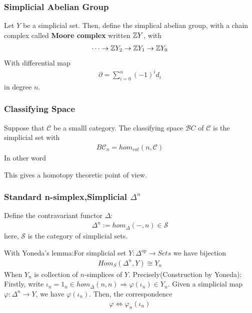 \documentclass[Total.tex]{subfiles}
\begin{document}
			\subsubsection{Simplicial Abelian Group}
				\begin{Def}
					Let $Y$ be a simplicial set. Then, define the simplical abelian group, with a chain complex called \textbf{Moore complex} written $\mathbb{Z} Y$, with
					\begin{gather*}
						\dots\rightarrow \mathbb{Z} Y_2\rightarrow \mathbb{Z} Y_1\rightarrow \mathbb{Z} Y_0
					\end{gather*}
					With differential map
					\begin{gather*}
						\partial=\sum_{i=0}^n (-1)^i d_i
					\end{gather*}
					in degree $n$. 
				\end{Def}
			\subsubsection{Classifying Space}
				\begin{Def}
					Suppose that $\mathcal{C}$ be a smalll category. The classifying space $\mathcal BC$ of $\mathcal{C}$ is the simplicial set with
					\begin{gather*}
						B\mathcal{C}_n=hom_{cat}(n,\mathcal{C})
					\end{gather*}
					In other word
					\begin{center}
					\end{center}
				\end{Def}
				This gives a homotopy theoretic point of view.
				\subsubsection{Standard n-simplex,Simplicial $\Delta^n$}
				\begin{Def}
					Define the contravariant functor $\Delta$:
					\begin{gather*}
						\Delta^n:=hom_\Delta(-,n)\in \mathcal{S}
					\end{gather*}
					here, $\mathcal{S}$ is the category of simplicial sets.
				\end{Def}
					With Yoneda's lemma:For simplicial set $Y:\Delta^{op}\rightarrow Sets$ we have bijection
				\begin{gather*}
					Hom_S(\Delta^n,Y)\cong Y_n
				\end{gather*}
				When $Y_n$ is collection of $n$-simplices of $Y$.
			 Precisely(Construction by Yoneda): Firstly, write $\iota_n=1_n\in hom_\Delta(n,n)\Rightarrow \varphi(\iota_n)\in Y_n$. Given a simplicial map $\varphi:\Delta^n\rightarrow Y$, we have $\varphi(\iota_n)$. Then, the correspondence
			 \begin{gather*}
			 	\varphi\Leftrightarrow \varphi_n(\iota_n)
			 \end{gather*}
				
\end{document}
